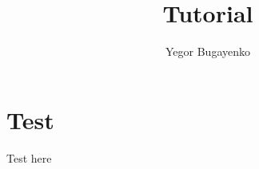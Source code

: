 \documentclass{./huawei}
\title{Tutorial}
\author{Yegor Bugayenko}
\begin{document}
\section*{Test}

Test here
\end{document}
